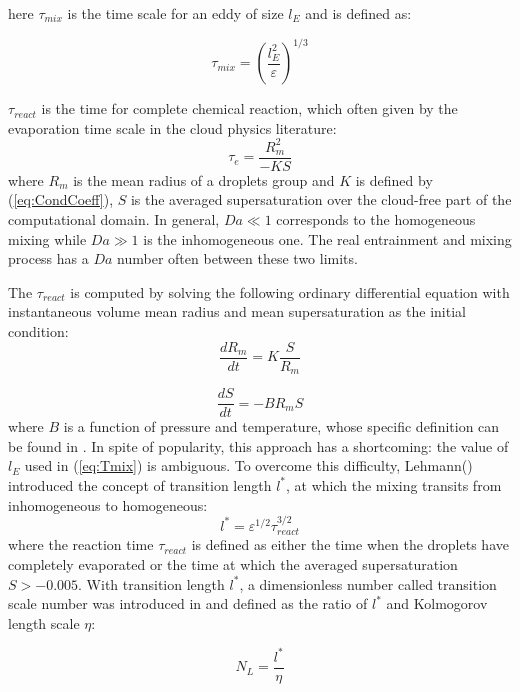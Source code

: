 \documentclass[draft,jgrga]{AGUTeX}
\begin{document}
\begin{article}
here $\tau_{mix}$ is the time scale for an eddy of size $l_E$ and is defined as:

\begin{equation}
\tau_{mix}=(\frac{l_E^{2}}{\varepsilon})^{1/3}\label{eq:Tmix}
\end{equation}

$\tau_{react}$ is the time for complete chemical reaction, which often given by the evaporation time scale in the cloud physics literature:
\begin{equation}
\tau_{e}=\frac{R_{m}^{2}}{-KS}\label{eq:Tevap}
\end{equation}
where $R_{m}$ is the mean radius of a droplets group and $K$ is defined
by (\ref{eq:CondCoeff}), $S$ is the averaged supersaturation over
the cloud-free part of the computational domain. In general, $Da\ll1$ corresponds to the homogeneous mixing while $Da\gg1$ is the inhomogeneous one. The real entrainment and mixing process has a $Da$ number often between
these two limits.

The $\tau_{react}$ is computed by solving the following ordinary differential equation with instantaneous volume mean radius and mean supersaturation as the initial condition:
\begin{equation}
\frac{dR_{m}}{dt}=K\frac{S}{R_{m}}\label{eq:DiffR}
\end{equation}

\begin{equation}
\frac{dS}{dt}=-BR_{m}S\label{eq:DiffSuper}
\end{equation}
where $B$ is a function of pressure and temperature, whose specific definition can be found in \cite{Chunsong11}. In spite of popularity, this approach has a shortcoming:
the value of $l_E$ used in (\ref{eq:Tmix}) is ambiguous. To overcome this difficulty, Lehmann(\cite{Lehmann09}) introduced the concept of transition length $l^{*}$, at which the mixing transits from inhomogeneous to homogeneous:
\begin{equation}
l^{*}=\varepsilon^{1/2}\tau_{react}^{3/2}\label{eq:TransL}
\end{equation}
where the reaction time $\tau_{react}$ is defined as either the time when the droplets have completely evaporated or the time at which the averaged supersaturation $S>-0.005$. 
With transition length $l^{*}$, a dimensionless number called transition scale number was introduced in \cite{Chunsong13} and defined as the ratio of $l^{*}$ and Kolmogorov length scale $\eta$:

\begin{equation}
N_{L}=\frac{l^{*}}{\eta}\label{eq:NL}
\end{equation}


\end{article}
\end{document}

